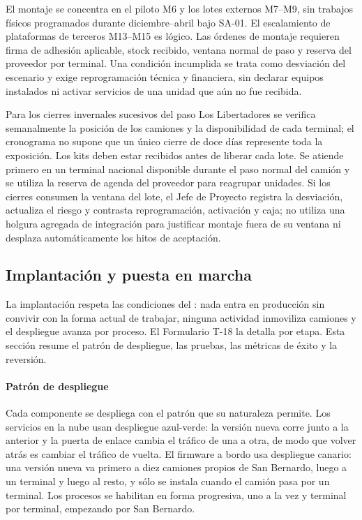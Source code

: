 El montaje se concentra en el piloto M6 y los lotes externos M7--M9, sin trabajos físicos
programados durante diciembre--abril bajo SA-01. El escalamiento de plataformas de terceros
M13--M15 es lógico. Las órdenes de montaje requieren firma de adhesión aplicable, stock recibido,
ventana normal de paso y reserva del proveedor por terminal. Una condición incumplida se trata
como desviación del escenario y exige reprogramación técnica y financiera, sin declarar equipos
instalados ni activar servicios de una unidad que aún no fue recibida.

Para los cierres invernales sucesivos del paso Los Libertadores se verifica semanalmente
la posición de los camiones y la disponibilidad de cada terminal; el cronograma no supone
que un único cierre de doce días represente toda la exposición. Los kits deben estar recibidos
antes de liberar cada lote. Se atiende primero en un terminal nacional disponible durante el
paso normal del camión y se utiliza la reserva de agenda del proveedor para reagrupar unidades.
Si los cierres consumen la ventana del lote, el Jefe de Proyecto registra la desviación,
actualiza el riesgo y contrasta reprogramación, activación y caja; no utiliza una holgura
agregada de integración para justificar montaje fuera de su ventana ni desplaza automáticamente
los hitos de aceptación.

\subsection{Implantación y puesta en marcha}\label{sec:7-implantacion}

La implantación respeta las condiciones del : nada entra en producción sin
convivir con la forma actual de trabajar, ninguna actividad inmoviliza camiones y el despliegue avanza
por proceso. El Formulario T-18 la detalla por etapa. Esta sección resume el patrón de despliegue, las
pruebas, las métricas de éxito y la reversión.

\paragraph{Patrón de despliegue}
Cada componente se despliega con el patrón que su naturaleza permite. Los servicios en la nube usan
despliegue azul-verde: la versión nueva corre junto a la anterior y la puerta de enlace cambia el tráfico
de una a otra, de modo que volver atrás es cambiar el tráfico de vuelta. El firmware a bordo usa
despliegue canario: una versión nueva va primero a diez camiones propios de San Bernardo, luego a un
terminal y luego al resto, y sólo se instala cuando el camión pasa por un terminal. Los procesos se
habilitan en forma progresiva, uno a la vez y terminal por terminal, empezando por San Bernardo.

